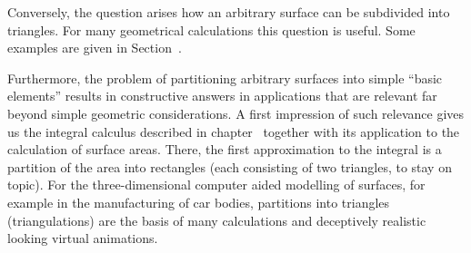 \begin{MIntro}
Conversely, the question arises how an arbitrary surface can be subdivided into triangles. 
For many geometrical calculations this question is useful. 
Some examples are given in Section~.

Furthermore, the problem of partitioning arbitrary surfaces into simple 
``basic elements'' results in constructive answers in applications that are relevant 
far beyond simple geometric considerations. A first impression of such relevance gives 
us the integral calculus described in chapter~ together with its application 
to the calculation of surface areas. There, the first approximation to the integral is 
a partition of the area into rectangles (each consisting of two triangles, to stay on  topic). For the three-dimensional computer aided modelling of surfaces,
for example in the manufacturing of car bodies, partitions into triangles 
(triangulations) are the basis of many calculations and deceptively realistic 
looking virtual animations. 
\end{MIntro}


